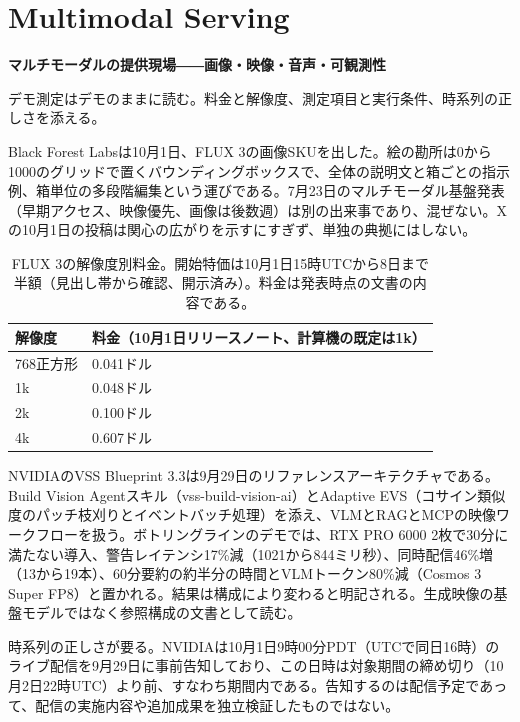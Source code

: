 \section{Multimodal Serving}
\begin{wideflow}
{\Large\bfseries マルチモーダルの提供現場――画像・映像・音声・可観測性}\par
\smallskip
{\color{SurveyMuted}デモ測定はデモのままに読む。料金と解像度、測定項目と実行条件、時系列の正しさを添える。}\par
\end{wideflow}

Black Forest Labsは10月1日、FLUX 3の画像SKUを出した\cite{flux3}。絵の勘所は0から1000のグリッドで置くバウンディングボックスで、全体の説明文と箱ごとの指示例、箱単位の多段階編集という運びである。7月23日のマルチモーダル基盤発表（早期アクセス、映像優先、画像は後数週）は別の出来事であり、混ぜない。Xの10月1日の投稿は関心の広がりを示すにすぎず、単独の典拠にはしない。

\begin{table}[h]
\centering\footnotesize
\begin{tabularx}{0.98\linewidth}{@{}lX@{}}
\toprule
解像度 & 料金（10月1日リリースノート、計算機の既定は1k） \\
\midrule
768正方形 & 0.041ドル \\
1k & 0.048ドル \\
2k & 0.100ドル \\
4k & 0.607ドル \\
\bottomrule
\end{tabularx}
\caption{FLUX 3の解像度別料金。開始特価は10月1日15時UTCから8日まで半額（見出し帯から確認、開示済み）。料金は発表時点の文書の内容である。}
\end{table}

NVIDIAのVSS Blueprint 3.3は9月29日のリファレンスアーキテクチャである\cite{vss33}。Build Vision Agentスキル（vss-build-vision-ai）とAdaptive EVS（コサイン類似度のパッチ枝刈りとイベントバッチ処理）を添え、VLMとRAGとMCPの映像ワークフローを扱う。ボトリングラインのデモでは、RTX PRO 6000 2枚で30分に満たない導入、警告レイテンシ17\%減（1021から844ミリ秒）、同時配信46\%増（13から19本）、60分要約の約半分の時間とVLMトークン80\%減（Cosmos 3 Super FP8）と置かれる。結果は構成により変わると明記される。生成映像の基盤モデルではなく参照構成の文書として読む。

時系列の正しさが要る。NVIDIAは10月1日9時00分PDT（UTCで同日16時）のライブ配信を9月29日に事前告知しており、この日時は対象期間の締め切り（10月2日22時UTC）より前、すなわち期間内である。告知するのは配信予定であって、配信の実施内容や追加成果を独立検証したものではない。

